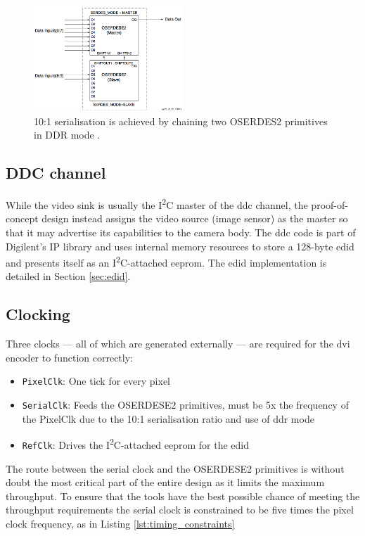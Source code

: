 \begin{figure}
  \centering
  \includegraphics[width=0.5\textwidth]{./img/10_1_serdes.png}
  \caption{10:1 serialisation is achieved by chaining two OSERDES2 primitives in DDR mode \cite{xilinx:ug471}.}
  \label{fig:10_1_serdes}
\end{figure}

\subsection{DDC channel}

While the video sink is usually the I\textsuperscript{2}C master of the \gls{ddc} channel, the proof-of-concept design instead assigns the video source (image sensor) as the master so that it may advertise its capabilities to the camera body. The \gls{ddc} code is part of Digilent's IP library and uses internal memory resources to store a 128-byte \gls{edid} and presents itself as an I\textsuperscript{2}C-attached \gls{eeprom}. The \gls{edid} implementation is detailed in Section \ref{sec:edid}.

\subsection{Clocking}
Three clocks --- all of which are generated externally --- are required for the \gls{dvi} encoder to function correctly:
\begin{itemize}
    \item \texttt{PixelClk}: One tick for every pixel
    \item \texttt{SerialClk}: Feeds the OSERDESE2 primitives, must be 5x the frequency of the PixelClk due to the 10:1 serialisation ratio and use of \gls{ddr} mode
    \item \texttt{RefClk}: Drives the I\textsuperscript{2}C-attached \gls{eeprom} for the \gls{edid}
\end{itemize}

The route between the serial clock and the OSERDESE2 primitives is without doubt the most critical part of the entire design as it limits the maximum throughput. To ensure that the tools have the best possible chance of meeting the throughput requirements the serial clock is constrained to be five times the pixel clock frequency, as in Listing \ref{lst:timing_constraints}

